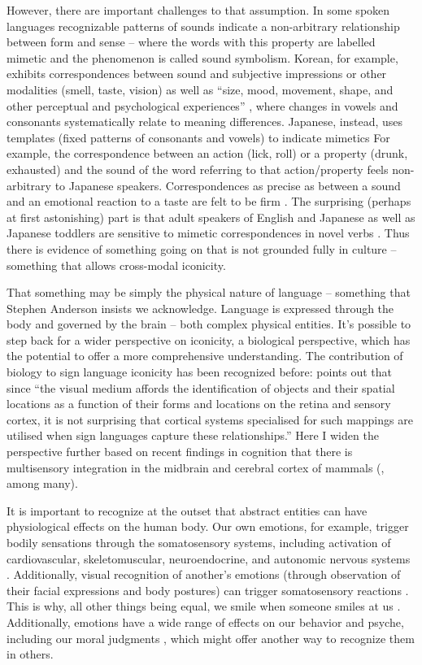 \documentclass[output=paper,
modfonts
]{LSP/langsci}
\begin{document}
However, there are important challenges to that assumption. In some
spoken languages recognizable patterns of sounds indicate a
non-arbitrary relationship between form and sense -- where the words
with this property are labelled mimetic and the phenomenon is called
sound symbolism. Korean, for example, exhibits correspondences between
sound and subjective impressions or other modalities (smell, taste,
vision) as well as ``size, mood, movement, shape, and other perceptual
and psychological experiences'' \citep[64]{cho2006}, where changes in vowels
and consonants systematically relate to meaning differences. Japanese,
instead, uses templates (fixed patterns of consonants and vowels) to
indicate mimetics \citep{hamano1998} For example, the correspondence between
an action (lick, roll) or a property (drunk, exhausted) and the sound of
the word referring to that action/property feels non-arbitrary to
Japanese speakers. Correspondences as precise as between a sound and an
emotional reaction to a taste are felt to be firm \citep{kagitani2014}. The surprising (perhaps at first astonishing) part is that adult
speakers of English and Japanese as well as Japanese toddlers are
sensitive to mimetic correspondences in novel verbs \citep{imai2008}.
Thus there is evidence of something going on that is not grounded fully
in culture -- something that allows cross-modal iconicity.

That something may be simply the physical nature of language --
something that Stephen Anderson insists we acknowledge. Language is
expressed through the body and governed by the brain -- both complex
physical entities. It's possible to step back for a wider perspective on
iconicity, a biological perspective, which has the potential to offer a
more comprehensive understanding. The contribution of biology to sign
language iconicity has been recognized before: \citet[150]{woll2009} points
out that since ``the visual medium affords the identification of objects
and their spatial locations as a function of their forms and locations
on the retina and sensory cortex, it is not surprising that cortical
systems specialised for such mappings are utilised when sign languages
capture these relationships.'' Here I widen the perspective further
based on recent findings in cognition that there is multisensory
integration in the midbrain and cerebral cortex of mammals (\citealt{stein2008}, among many).

It is important to recognize at the outset that abstract entities can
have physiological effects on the human body. Our own emotions, for
example, trigger bodily sensations through the somatosensory systems,
including activation of cardiovascular, skeletomuscular, neuroendocrine,
and autonomic nervous systems \citep{nummenmaa2014}. Additionally,
visual recognition of another's emotions (through observation of their
facial expressions and body postures) can trigger somatosensory
reactions \citep{rudrauf2009,sel2014}.
This is why, all other things being equal, we smile when someone smiles
at us \citep{niedenthal2007}. Additionally, emotions have a wide range of
effects on our behavior and psyche, including our moral judgments
\citep{charland2008}, which might offer another way to recognize
them in others.
\end{document}
